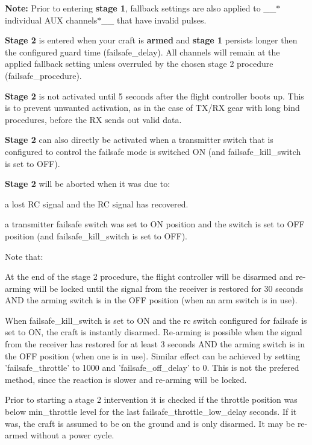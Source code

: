 {\bfseries Note\+:} Prior to entering {\bfseries stage 1}, fallback settings are also applied to \+\_\+\+\_\+$\ast$individual A\+U\+X channels$\ast$\+\_\+\+\_\+ that have invalid pulses.

{\bfseries Stage 2} is entered when your craft is {\bfseries armed} and {\bfseries stage 1} persists longer then the configured guard time ({\ttfamily failsafe\+\_\+delay}). All channels will remain at the applied fallback setting unless overruled by the chosen stage 2 procedure ({\ttfamily failsafe\+\_\+procedure}).

{\bfseries Stage 2} is not activated until 5 seconds after the flight controller boots up. This is to prevent unwanted activation, as in the case of T\+X/\+R\+X gear with long bind procedures, before the R\+X sends out valid data.

{\bfseries Stage 2} can also directly be activated when a transmitter switch that is configured to control the failsafe mode is switched O\+N (and {\ttfamily failsafe\+\_\+kill\+\_\+switch} is set to O\+F\+F).

{\bfseries Stage 2} will be aborted when it was due to\+:


\begin{DoxyItemize}
\item a lost R\+C signal and the R\+C signal has recovered.
\item a transmitter failsafe switch was set to O\+N position and the switch is set to O\+F\+F position (and {\ttfamily failsafe\+\_\+kill\+\_\+switch} is set to O\+F\+F).
\end{DoxyItemize}

Note that\+:
\begin{DoxyItemize}
\item At the end of the stage 2 procedure, the flight controller will be disarmed and re-\/arming will be locked until the signal from the receiver is restored for 30 seconds A\+N\+D the arming switch is in the O\+F\+F position (when an arm switch is in use).
\item When {\ttfamily failsafe\+\_\+kill\+\_\+switch} is set to O\+N and the rc switch configured for failsafe is set to O\+N, the craft is instantly disarmed. Re-\/arming is possible when the signal from the receiver has restored for at least 3 seconds A\+N\+D the arming switch is in the O\+F\+F position (when one is in use). Similar effect can be achieved by setting 'failsafe\+\_\+throttle' to 1000 and 'failsafe\+\_\+off\+\_\+delay' to 0. This is not the prefered method, since the reaction is slower and re-\/arming will be locked.
\item Prior to starting a stage 2 intervention it is checked if the throttle position was below {\ttfamily min\+\_\+throttle} level for the last {\ttfamily failsafe\+\_\+throttle\+\_\+low\+\_\+delay} seconds. If it was, the craft is assumed to be on the ground and is only disarmed. It may be re-\/armed without a power cycle.
\end{DoxyItemize}

